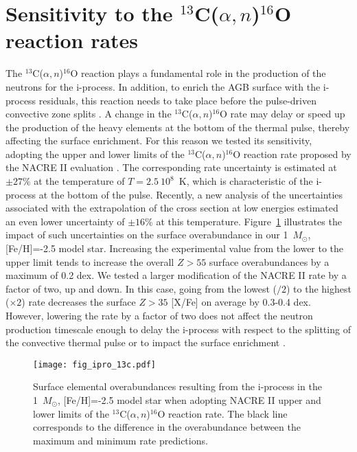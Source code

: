 \documentclass{aa}
\def\iso#1{$^{#1}$}
\def\Msun{$M_{\odot}$}
\def\an{$\alpha,n$}
\begin{document}
\section{Sensitivity to the  \iso{13}C(\an)\iso{16}O reaction rates}
\label{sect_13c}

The  \iso{13}C(\an)\iso{16}O reaction plays a fundamental role in the production of the neutrons for the i-process. In addition, to enrich the AGB surface with the i-process residuals, this reaction needs to take place before the pulse-driven convective zone splits \citep[see Sect. 3 of ][for more details]{Choplin21}. A change in the  \iso{13}C(\an)\iso{16}O rate may delay or speed up the production of the heavy elements at the bottom of the thermal pulse, thereby affecting the surface enrichment. For this reason we tested its sensitivity, adopting the upper and lower limits of the  \iso{13}C(\an)\iso{16}O reaction rate proposed by the NACRE II evaluation \citep{Xu13b}. The corresponding rate uncertainty is estimated at $\pm 27$\% at the temperature of $T=2.5~10^8$~K, which is characteristic of the i-process at the bottom of the pulse.
Recently, a new analysis of the uncertainties associated with the extrapolation of the cross section at low energies \citep{deBoer20} estimated an even lower uncertainty of  $\pm 16$\% at this temperature.
Figure~\ref{fig_ipro_13c} illustrates the impact of such uncertainties on the surface overabundance in our 1~\Msun{}, [Fe/H]=-2.5 model star. Increasing the experimental value from the lower to the upper limit tends to increase the overall $Z>55$ surface overabundances by a maximum of 0.2 dex.
We tested a larger modification of the NACRE II rate by a factor of two, up and down. In this case, going from the lowest ($/2$) to the highest ($\times 2$) rate decreases the surface $Z>35$ [X/Fe] on average by 0.3-0.4 dex. However,  lowering the rate by a factor of two does not affect the neutron production timescale enough to delay the i-process with respect to the splitting of the convective thermal pulse or to impact the surface enrichment \citep{Choplin21}.

 \begin{figure}
\texttt{[image: fig\_ipro\_13c.pdf]}
\caption{Surface elemental overabundances resulting from the i-process in the 1~\Msun{}, [Fe/H]=-2.5 model star when adopting NACRE II upper and lower limits of the \iso{13}C(\an)\iso{16}O reaction rate. The black line corresponds to the difference in the overabundance between the maximum and minimum rate predictions.
 }
\label{fig_ipro_13c}
\end{figure}
\end{document}
